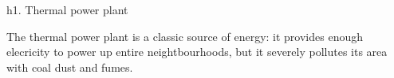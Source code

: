 h1. Thermal power plant

The thermal power plant is a classic source of energy: it provides enough elecricity to power up entire neightbourhoods, but it severely pollutes its area with coal dust and fumes.